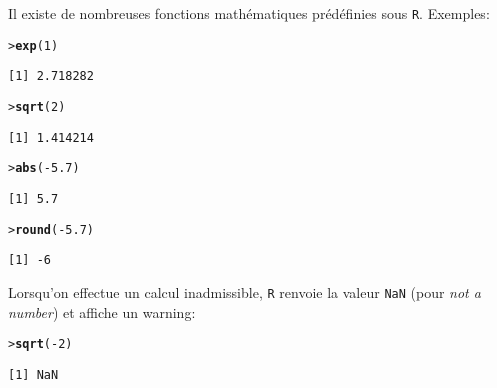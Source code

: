 \documentclass[11pt]{article}
\makeatletter
\numberwithin{equation}{section}
\theoremstyle{remark}
\newenvironment{kframe}{%
 \def\at@end@of@kframe{}%
 \ifinner\ifhmode%
  \def\at@end@of@kframe{\end{minipage}}%
  \begin{minipage}{\columnwidth}%
 \fi\fi%
 \def\FrameCommand##1{\hskip\@totalleftmargin \hskip-\fboxsep
 \colorbox{shadecolor}{##1}\hskip-\fboxsep
     \hskip-\linewidth \hskip-\@totalleftmargin \hskip\columnwidth}%
 \MakeFramed {\advance\hsize-\width
   \@totalleftmargin\z@ \linewidth\hsize
   \@setminipage}}%
 {\par\unskip\endMakeFramed%
 \at@end@of@kframe}
\newenvironment{knitrout}{}{}
\newcommand{\hlnum}[1]{\textcolor[rgb]{0.43,0.21,0.1}{#1}}%
\newcommand{\hlopt}[1]{\textcolor[rgb]{0,0,0}{#1}}%
\newcommand{\hlstd}[1]{\textcolor[rgb]{0,0.2,0.4}{#1}}%
\newcommand{\hlkwd}[1]{\textcolor[rgb]{0.76,0.13,0.28}{\textbf{#1}}}%
\makeatother
\begin{document}
Il existe de nombreuses fonctions mathématiques prédéfinies sous \texttt R. Exemples:
\begin{knitrout}
\color{fgcolor}\begin{kframe}
\begin{alltt}
\hlstd{> }\hlkwd{exp}\hlstd{(}\hlnum{1}\hlstd{)}
\end{alltt}
\begin{verbatim}
[1] 2.718282
\end{verbatim}
\begin{alltt}
\hlstd{> }\hlkwd{sqrt}\hlstd{(}\hlnum{2}\hlstd{)}
\end{alltt}
\begin{verbatim}
[1] 1.414214
\end{verbatim}
\begin{alltt}
\hlstd{> }\hlkwd{abs}\hlstd{(}\hlopt{-}\hlnum{5.7}\hlstd{)}
\end{alltt}
\begin{verbatim}
[1] 5.7
\end{verbatim}
\begin{alltt}
\hlstd{> }\hlkwd{round}\hlstd{(}\hlopt{-}\hlnum{5.7}\hlstd{)}
\end{alltt}
\begin{verbatim}
[1] -6
\end{verbatim}
\end{kframe}
\end{knitrout}
Lorsqu'on effectue un calcul inadmissible, \texttt R  renvoie la valeur \texttt{NaN} (pour {\it not a number}) et affiche un warning:
\begin{knitrout}
\color{fgcolor}\begin{kframe}
\begin{alltt}
\hlstd{> }\hlkwd{sqrt}\hlstd{(}\hlopt{-}\hlnum{2}\hlstd{)}
\end{alltt}


{\ttfamily\noindent\color{warningcolor}{Warning in sqrt(-2): production de NaN}}\begin{verbatim}
[1] NaN
\end{verbatim}
\end{kframe}
\end{knitrout}
\end{document}
